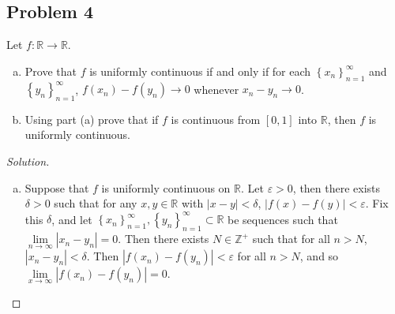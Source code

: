 \documentclass[12pt]{article}
\newcommand{\z}{\mathbb{Z}}
\newcommand{\real}{\mathbb{R}}
\newcommand\setb[1]{\left \{ #1 \right \}}
\newcommand{\eps}{\varepsilon}
\theoremstyle{definition}
\begin{document}
\subsection{Problem 4}
Let $f : \real \to \real$.
\begin{enumerate}[(a)]
    \item Prove that $f$ is uniformly continuous if and only if for each $\setb{ x_n }_{n=1}^{\infty}$ and $\setb{ y_n }_{n=1}^{\infty}$, $f(x_n) - f(y_n) \to 0$ whenever $x_n - y_n \to 0$.
    \item Using part (a) prove that if $f$ is continuous from $[0,1]$ into $\real$, then $f$ is uniformly continuous.
\end{enumerate}
\begin{proof}[Solution]
    \noindent
    \begin{enumerate}[(a)]
        \item Suppose that $f$ is uniformly continuous on $\real$. Let $\eps > 0$, then there exists $\delta > 0$ such that for any $x , y \in \real$ with $|x - y| < \delta$, $|f(x) - f(y)| < \eps$. Fix this $\delta$, and let $\setb{ x_n }_{n=1}^{\infty} , \setb{ y_n }_{n=1}^{\infty} \subset \real$ be sequences such that $\lim\limits_{n \to \infty} |x_n - y_n| = 0$. Then there exists $N \in \z^+$ such that for all $n > N$, $|x_n - y_n| < \delta$. Then $|f(x_n) - f(y_n)| < \eps$ for all $n > N$, and so $\lim\limits_{x \to \infty} |f(x_n) - f(y_n)| = 0$.
        

\end{enumerate}
\end{proof}
\end{document}
